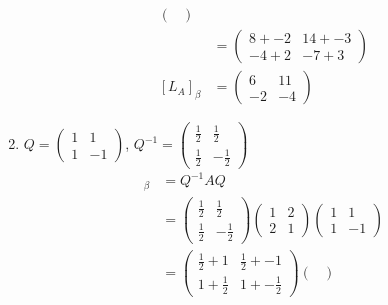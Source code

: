 \documentclass[13pt]{article}
\begin{document}
\begin{enumerate}[label=(\alph*),leftmargin=*]
\begin{align*}
\begin{pmatrix}
                  \end{pmatrix} \\
                &=
                  \begin{pmatrix}
                    8 + -2 & 14 + -3 \\
                    -4 + 2 & -7 + 3
                  \end{pmatrix} \\
    [L_A]_\beta &=
                  \begin{pmatrix}
                    6 & 11 \\
                    -2 & -4
                  \end{pmatrix}
  \end{align*}
  
\item $Q =
  \begin{pmatrix}
    1 & 1 \\
    1 & -1
  \end{pmatrix}
  $, $Q^{-1} =
  \begin{pmatrix}
    \frac{1}{2} & \frac{1}{2} \\
    \frac{1}{2} & -\frac{1}{2}
  \end{pmatrix}
  $
  \begin{align*}
    [L_A]_\beta &= Q^{-1}AQ \\
                &=
                  \begin{pmatrix}
                    \frac{1}{2} & \frac{1}{2} \\
                    \frac{1}{2} & -\frac{1}{2}
                  \end{pmatrix}
                  \begin{pmatrix}
                    1 & 2 \\
                    2 & 1
                  \end{pmatrix}
                  \begin{pmatrix}
                    1 & 1 \\
                    1 & -1
                  \end{pmatrix} \\
                &=
                  \begin{pmatrix}
                    \frac{1}{2} + 1 & \frac{1}{2} + -1 \\
                    1 + \frac{1}{2} & 1 + -\frac{1}{2}
                  \end{pmatrix}
                  \begin{pmatrix}

\end{pmatrix}
\end{align*}
\end{enumerate}
\end{document}

